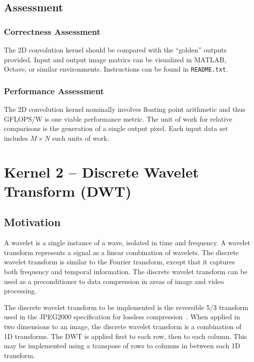 \documentclass{report}
\begin{document}
\subsection{Assessment}

\subsubsection{Correctness Assessment}

The 2D convolution kernel should be compared with the ``golden'' outputs provided.
Input and output image matrics can be visualized in MATLAB, Octave, or similar
environments.  Instructions can be found in \texttt{README.txt}.

\subsubsection{Performance Assessment}

The 2D convolution kernel nominally involves floating point arithmetic and
thus GFLOPS/W is one viable performance metric.
The unit of work for relative comparisons is the generation of a single
output pixel.
Each input data set includes $M \times N$ such units of work.


\section{Kernel 2 -- Discrete Wavelet Transform (DWT)}
\label{sec:app1:dwt}

\subsection{Motivation}

A wavelet is a single instance of a wave, isolated in time and frequency.
A wavelet transform represents a signal as a linear combination of wavelets.
The discrete wavelet transform is similar to the Fourier transform, except that
it captures both frequency and temporal information.  The discrete wavelet
transform can be used as a preconditioner to data compression in areas of
image and video processing.

The discrete wavelet transform to be implemented is the reversible 5/3 transform
used in the JPEG2000 specification for lossless compression~\cite{jpeg2000,Adams01wavelettransforms}.
When applied in two dimensions to an image, the discrete wavelet transform is
a combination of 1D transforms.  The DWT is applied first to each row, then to
each column.  This may be implemented using a transpose of rows to columns in
between each 1D transform.
\end{document}

